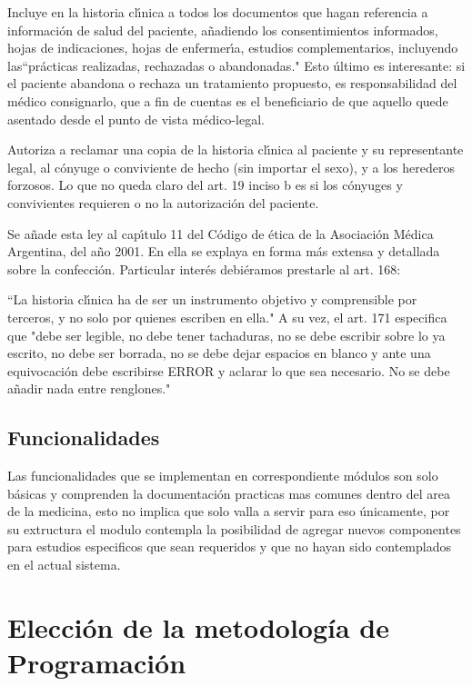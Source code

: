 Incluye en la historia cl\'{\i}nica a todos los documentos que hagan referencia a 
informaci\'on de salud del paciente, a\~nadiendo los consentimientos informados, 
hojas de indicaciones, hojas de enfermer\'{\i}a, estudios complementarios, 
incluyendo las``pr\'acticas realizadas, rechazadas o abandonadas." 
Esto  \'ultimo es interesante: si el paciente abandona o rechaza un tratamiento 
propuesto, es responsabilidad del m\'edico consignarlo, que a fin de cuentas es el
beneficiario de que aquello quede asentado desde el punto de vista m\'edico-legal.

Autoriza a reclamar una copia de la historia cl\'{\i}nica al paciente y su representante 
legal, al c\'onyuge o conviviente de hecho (sin importar el sexo), y a los herederos 
forzosos. Lo que no queda claro del art. 19 inciso b es si los c\'onyuges y 
convivientes requieren o no la autorizaci\'on del paciente.

Se a\~nade esta ley al cap\'{\i}tulo 11 del C\'odigo de \'etica de la Asociaci\'on M\'edica 
Argentina, del a\~no 2001. En ella se explaya en forma m\'as extensa y detallada sobre
la confecci\'on. Particular inter\'es debi\'eramos prestarle al art. 168:

``La historia cl\'{\i}nica ha de ser un instrumento objetivo y comprensible por terceros,
y no solo por quienes escriben en ella." A su vez, el art. 171 especifica que 
"debe ser legible, no debe tener tachaduras, no se debe escribir sobre lo ya 
escrito, no debe ser borrada, no se debe dejar espacios en blanco y ante una
equivocaci\'on debe escribirse ERROR y aclarar lo que sea necesario. No se debe a\~nadir
nada entre renglones."


\subsection{Funcionalidades}

Las funcionalidades que se implementan en correspondiente m\'odulos son solo
b\'asicas y comprenden la documentaci\'on practicas mas comunes dentro del area de la 
medicina, esto no implica que solo valla a servir para eso \'unicamente, por su 
extructura el modulo contempla la posibilidad de agregar nuevos componentes para 
estudios especificos que sean requeridos y que no hayan sido contemplados en el 
actual sistema.




\section{Elecci\'on de la metodolog\'ia de Programaci\'on}

